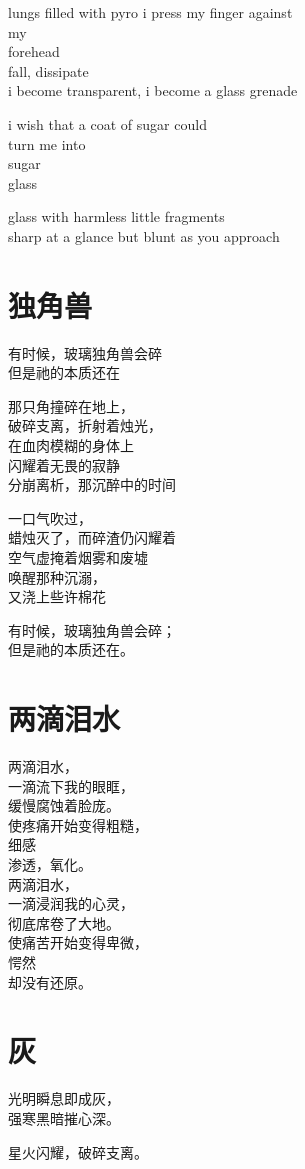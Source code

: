\documentclass[parskip=full,12pt,oneside,a5paper]{scrbook}
\begin{document}
lungs filled with pyro i press my finger against\\
my\\
forehead\\
fall, dissipate\\
i become transparent, i become a glass grenade

i wish that a coat of sugar could\\
turn me into\\
sugar\\
glass

glass with harmless little fragments\\
sharp at a glance but blunt as you approach

\chapter{独角兽}
\begingroup\addtolength{\baselineskip}{0.75ex}

有时候，玻璃独角兽会碎\\
但是祂的本质还在

那只角撞碎在地上，\\
破碎支离，折射着烛光，\\
在血肉模糊的身体上\\
闪耀着无畏的寂静\\
分崩离析，那沉醉中的时间

一口气吹过，\\
蜡烛灭了，而碎渣仍闪耀着\\
空气虚掩着烟雾和废墟\\
唤醒那种沉溺，\\
又浇上些许棉花

有时候，玻璃独角兽会碎；\\
但是祂的本质还在。

\endgroup

\chapter{两滴泪水}
\begingroup\addtolength{\baselineskip}{0.75ex}

两滴泪水，\\
一滴流下我的眼眶，\\
缓慢腐蚀着脸庞。\\
使疼痛开始变得粗糙，\\
细感\\
渗透，氧化。\\

两滴泪水，\\
一滴浸润我的心灵，\\
彻底席卷了大地。\\
使痛苦开始变得卑微，\\
愕然\\
却没有还原。

\endgroup

\chapter{灰}
\begingroup\addtolength{\baselineskip}{0.75ex}

光明瞬息即成灰，\\
强寒黑暗摧心深。

星火闪耀，破碎支离。

\endgroup
\end{document}
